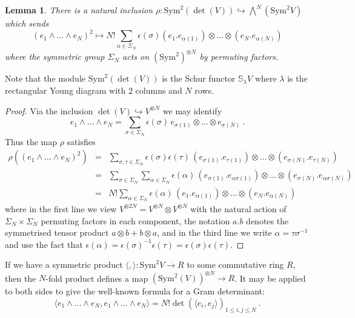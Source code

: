 \documentclass[a4paper,10pt]{amsart}
\newtheorem{lem}[thm]{Lemma}
\theoremstyle{definition}
\theoremstyle{remark}
\numberwithin{equation}{section}
\newcommand{\0}{\color{blue}{\mathsf{0}}}
\begin{document}
\begin{lem} There is a  natural inclusion 
$ \rho: \mathrm{Sym}^2  \left(\det(V)\right)   \hookrightarrow    \textstyle{\bigwedge^{\!N}   (\mathrm{Sym}^2 V) } $
 which sends
\[ (e_1 \wedge \ldots \wedge e_N)^2  \mapsto N! \sum_{\alpha \in \Sigma_N} \epsilon(\sigma) (e_1. e_{\alpha(1)} ) \otimes \ldots \otimes   (e_N.e_{\alpha(N)}) \]
where the symmetric group $\Sigma_N$ acts on $(\mathrm{Sym}^2)^{\otimes N}$ by permuting factors.  
\end{lem}
Note that the module  $\mathrm{Sym}^2  \left(\det(V)\right)$ is the Schur functor $\mathbb{S}_{\lambda} V$ where $\lambda$ is the rectangular Young diagram with $2$ columns and $N$ rows.

\begin{proof} Via the inclusion $\det(V) \hookrightarrow V^{\otimes N}$ we may identify
\[  e_1 \wedge \ldots \wedge e_N  =   \sum_{\sigma \in \Sigma_N}  \epsilon(\sigma) \, e_{\sigma(1)} \otimes \ldots \otimes e_{\sigma(N)}  \ . \]
Thus the map $\rho$ satisfies
\begin{eqnarray} 
\rho \left( (e_1 \wedge \ldots \wedge e_N)^2 \right)  & = &   \sum_{\sigma,\tau  \in \Sigma_N}  \epsilon(\sigma ) \epsilon(\tau) \, (e_{\sigma(1)}.e_{\tau(1)} ) \otimes \ldots \otimes (e_{\sigma(N)} . e_{\tau(N)})  \nonumber\\ 
& = &   \sum_{\sigma \in \Sigma_N} \sum_{\alpha  \in \Sigma_N}  \epsilon(\alpha) \, (e_{\sigma(1)}.e_{\alpha \sigma(1)} ) \otimes \ldots \otimes (e_{\sigma(N)} . e_{\alpha \sigma(N)})\nonumber\\
&  =&  N!    \sum_{\alpha  \in \Sigma_N}  \epsilon(\alpha) \, (e_{1}.e_{\alpha (1)} ) \otimes \ldots \otimes (e_{N} . e_{\alpha(N)}) \nonumber
\end{eqnarray} 
where in the first line we view  $V^{\otimes 2 N} = V^{\otimes N}\otimes V^{\otimes N}$ with the natural action of $\Sigma_N \times \Sigma_N$ permuting factors in each component, the notation $a . b$ denotes the symmetrised tensor product  $a \otimes b + b \otimes a$, and in the  third line we write $\alpha =\tau \sigma^{-1}$  and use the fact that $\epsilon(\alpha) = \epsilon(\sigma)^{-1}  \epsilon(\tau) = \epsilon(\sigma)  \epsilon(\tau) $. \end{proof} 
If we have a symmetric product $\langle , \rangle : \mathrm{Sym}^2 V \rightarrow R$ to some commutative ring $R$, then the $N$-fold product defines a map
$(\mathrm{Sym}^2(V))^{\otimes N} \rightarrow R$. It may be applied to both sides to give the well-known formula for a Gram determinant:
\[  \langle e_1\wedge \ldots \wedge e_N,  e_1\wedge \ldots \wedge e_N\rangle=   N! \det \left( \langle e_i, e_j\rangle \right)_{1\leq i,j \leq N}  \ .\]
\end{document}
